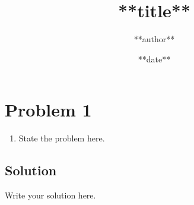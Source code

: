 \documentclass[11pt,a4paper]{article}
\title{**title**}
\author{**author**}
\date{**date**}
\begin{document}
\maketitle

\section*{Problem 1}
\begin{enumerate}[label=(\alph*)]
    \item State the problem here.
\end{enumerate}

\subsection*{Solution}
Write your solution here.
\end{document}
